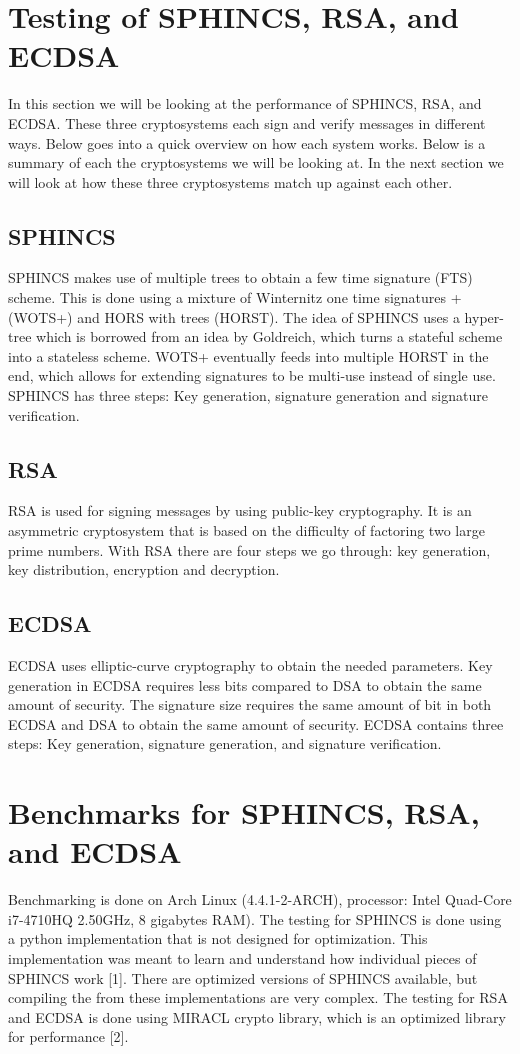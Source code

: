 \documentclass[]{scrartcl}
\begin{document}
\section*{Testing of SPHINCS, RSA, and ECDSA}
In this section we will be looking at the performance of SPHINCS, RSA, and ECDSA. These three cryptosystems each sign and verify messages in different ways. Below goes into a quick overview on how each system works. Below is a summary of each the cryptosystems we will be looking at. In the next section we will look at how these three cryptosystems match up against each other.

\subsection*{SPHINCS}
SPHINCS makes use of multiple trees to obtain a few time signature (FTS) scheme. This is done using a mixture of Winternitz one time signatures + (WOTS+) and HORS with trees (HORST). The idea of SPHINCS uses a hyper-tree which is borrowed from an idea by Goldreich, which turns a stateful scheme into a stateless scheme. WOTS+ eventually feeds into multiple HORST in the end, which allows for extending signatures to be multi-use instead of single use. SPHINCS has three steps: Key generation, signature generation and signature verification.

\subsection*{RSA}
RSA is used for signing messages by using public-key cryptography. It is an asymmetric cryptosystem that is based on the difficulty of factoring two large prime numbers. With RSA there are four steps we go through: key generation, key distribution, encryption and decryption.

\subsection*{ECDSA}
ECDSA uses elliptic-curve cryptography to obtain the needed parameters. Key generation in ECDSA requires less bits compared to DSA to obtain the same amount of security. The signature size requires the same amount of bit in both ECDSA and DSA to obtain the same amount of security. ECDSA contains three steps: Key generation, signature generation, and signature verification.

\section*{Benchmarks for SPHINCS, RSA, and ECDSA}
Benchmarking is done on Arch Linux (4.4.1-2-ARCH), processor: Intel Quad-Core i7-4710HQ 2.50GHz, 8 gigabytes RAM). The testing for SPHINCS is done using a python implementation that is not designed for optimization. This implementation was meant to learn and understand how individual pieces of SPHINCS work [1]. There are optimized versions of SPHINCS available, but compiling the from these implementations are very complex. The testing for RSA and ECDSA is done using MIRACL crypto library, which is an optimized library for performance [2].
\end{document}
